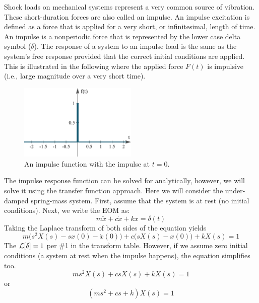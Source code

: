 \documentclass[12pt,letter]{article}
\begin{document}
Shock loads on mechanical systems represent a very common source of vibration. These short-duration forces are also called an impulse. An impulse excitation is defined as a force that is applied for a very short, or infinitesimal, length of time. An impulse is a nonperiodic force that is represented by the lower case delta symbol ($\delta$). The response of a system to an impulse load is the same as the system's free response provided that the correct initial conditions are applied. This is illustrated in the following where the applied force $F(t)$ is impulsive (i.e., large magnitude over a very short time).

\begin{figure}[H]
	\centering
	\includegraphics[width=0.5\textwidth]{../figures/unit_impulse.png}
	\caption{An impulse function with the impulse at $t=0$. }
\end{figure}

The impulse response function can be solved for analytically, however, we will solve it using the transfer function approach. Here we will consider the under-damped spring-mass system. First, assume that the system is at rest (no initial conditions). Next, we write the EOM as:
\begin{equation}
m\ddot{x} +c\dot{x} +kx = \delta(t)
\end{equation}
Taking the Laplace transform of both sides of the equation yields 
\begin{equation}
m\big(s^2X(s)-sx(0) - \dot{x}(0)\big) + c\big(sX(s)-x(0)\big) +kX(s) =1
\end{equation}
The $\mathcal{L}{\left[\delta\right]}=1$ per \#1 in the transform table. However, if we assume zero initial conditions (a system at rest when the impulse happens), the equation simplifies too. 
\begin{equation}
ms^2X(s) + csX(s) +kX(s) =1
\end{equation}
or
\begin{equation}
(ms^2 + cs +k)X(s) =1
\end{equation}
\end{document}
